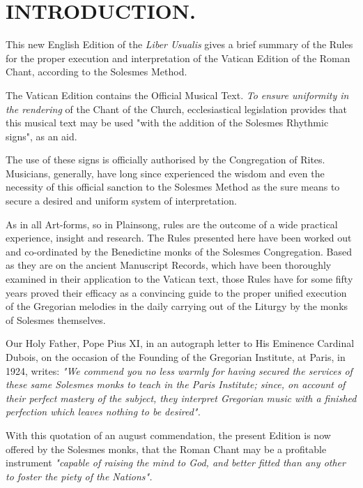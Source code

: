 \renewcommand{\thesection}{}

\section{INTRODUCTION.}

This new English Edition of the {\it Liber Usualis} gives a brief summary of the Rules for the proper execution and interpretation of the Vatican Edition of the Roman Chant, according to the Solesmes Method.

The Vatican Edition contains the Official Musical Text. {\it To ensure uniformity in the rendering} of the Chant of the Church, ecclesiastical legislation provides that this musical text may be used "with the addition of the Solesmes Rhythmic signs", as an aid.

The use of these signs is officially authorised by the Congregation of Rites. Musicians, generally, have long since experienced the wisdom and even the necessity of this official sanction to the Solesmes Method as the sure means to secure a desired and uniform system of interpretation.

As in all Art-forms, so in Plainsong, rules are the outcome of a wide practical experience, insight and research. The Rules presented here have been worked out and co-ordinated by the Benedictine monks of the Solesmes Congregation. Based as they are on the ancient Manuscript Records, which have been thoroughly examined in their application to the Vatican text, those Rules have for some fifty years proved their efficacy as a convincing guide to the proper unified execution of the Gregorian melodies in the daily carrying out of the Liturgy by the monks of Solesmes themselves.

Our Holy Father, Pope {\sc Pius XI}, in an autograph letter to His Eminence Cardinal Dubois, on the occasion of the Founding of the Gregorian Institute, at Paris, in 1924, writes: {\it "We commend you no less warmly for having secured the services of these same Solesmes monks to teach in the Paris Institute; since, on account of their perfect mastery of the subject, they interpret Gregorian music with a finished perfection which leaves nothing to be desired".}

With this quotation of an august commendation, the present Edition is now offered by the Solesmes monks, that the Roman Chant may be a profitable instrument {\it "capable of raising the mind to God, and better fitted than any other to foster the piety of the Nations".}

